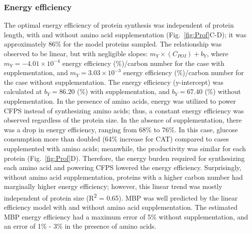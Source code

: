 \documentclass[journal=asbcd6,manuscript=article]{achemso}
\begin{document}


\subsubsection{Energy efficiency}
The optimal energy efficiency of protein synthesis was independent of protein length, with and without amino acid supplementation (Fig.~\ref{fig:Prof}C-D); it was approximately 86\% for the model proteins sampled.
The relationship was observed to be linear, but with negligible slopes: $m_{Y}\times(C_{POI})+b_{Y}$, where $m_{Y} = -4.01\times10^{-4}$ energy efficiency (\%)/carbon number for the case with supplementation, and $m_{Y} = 3.03\times10^{-3}$ energy efficiency (\%)/carbon number for the case without supplementation.
The energy efficiency (y-intercept) was calculated at $b_{Y} = 86.20$ (\%) with supplementation, and $b_{Y} = 67.40$ (\%) without supplementation.
In the presence of amino acids, energy was utilized to power CFPS instead of synthesizing amino acids; thus, a constant energy efficiency was observed regardless of the protein size.
In the absence of supplementation, there was a drop in energy efficiency, ranging from 68\% to 76\%.
In this case, glucose consumption more than doubled (64\% increase for CAT) compared to cases supplemented with amino acids; meanwhile, the productivity was similar for each protein (Fig.~\ref{fig:Prof}D).
Therefore, the energy burden required for synthesizing each amino acid and powering CFPS lowered the energy efficiency.
Surprisingly, without amino acid supplementation, proteins with a higher carbon number had marginally higher energy efficiency; however, this linear trend was mostly independent of protein size (R\textsuperscript{2} = 0.65).
MBP was well predicted by the linear efficiency model with and without amino acid supplementation.
The estimated MBP energy efficiency had a maximum error of 5\% without supplementation, and an error of 1\% - 3\% in the presence of amino acids.
\end{document}

